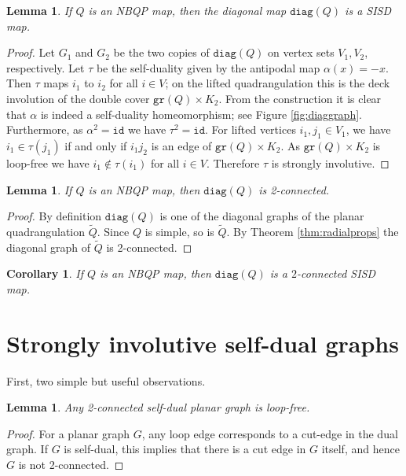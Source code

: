 \documentclass{article}
\newtheorem{corollary}[theorem]{Corollary}
\newtheorem{lemma}[theorem]{Lemma}
\newcommand{\diag}[0]{\mathtt{diag}}
\newcommand{\gr}{\mathtt{gr}}
\newcommand{\id}{\mathtt{id}}
\begin{document}
\begin{lemma}\label{lem:diagissisd}
    If $Q$ is an NBQP map, then the diagonal map $\diag(Q)$ is a SISD map.
\end{lemma}
\begin{proof}
Let $G_1$ and $G_2$ be the two copies of $\diag(Q)$ on vertex sets $V_1,V_2$, respectively. Let $\tau$ be the self-duality given by the antipodal map $\alpha(x)=-x$. Then $\tau$ maps $i_1$ to $i_2$ for all $i\in V$; on the lifted quadrangulation this is the deck involution of the double cover ${\gr (Q)}\times K_2 $. From the construction it is clear that $\alpha$ is indeed a self-duality homeomorphism; see Figure \ref{fig:diaggraph}. Furthermore, as $\alpha^2=\id$ we have $\tau^2=\id$. For lifted vertices $i_1,j_1\in V_1$, we have $i_1\in \tau(j_1)$ if and only if $i_1j_2$ is an edge of $\gr(Q)\times K_2$. As ${\gr(Q)}\times K_2$ is loop-free we have $i_1\notin \tau(i_1)$ for all $i\in V$. Therefore $\tau$ is strongly involutive.
\end{proof}



\begin{lemma}\label{lem:2connectivity}
If $Q$ is an NBQP map, then $\diag(Q)$ is 2-connected.     
\end{lemma}
\begin{proof}
   
    By definition $\diag(Q)$ is one of the diagonal graphs of the planar quadrangulation $\widetilde{Q}$. Since $Q$ is simple, so is $\widetilde{Q}$.  By Theorem \ref{thm:radialprops} the diagonal graph of $\widetilde Q$ is 2-connected.
    
    
\end{proof}

\begin{corollary}\label{cor:diagis2connsisd}
If $Q$ is an NBQP map, then $\diag(Q)$ is a $2$-connected SISD map.
\end{corollary}

   




\section{Strongly involutive self-dual graphs}\label{sec:sisdgraphs}




First, two simple but useful observations.  

\begin{lemma}\label{lem:selfdualloopfree}
    Any 2-connected self-dual planar graph is loop-free. 
\end{lemma}
\begin{proof}
    For a planar graph $G$, any loop edge corresponds to a cut-edge in the dual graph. If $G$ is self-dual, this implies that there is a cut edge in $G$ itself, and hence $G$ is not 2-connected.
\end{proof}
\end{document}
